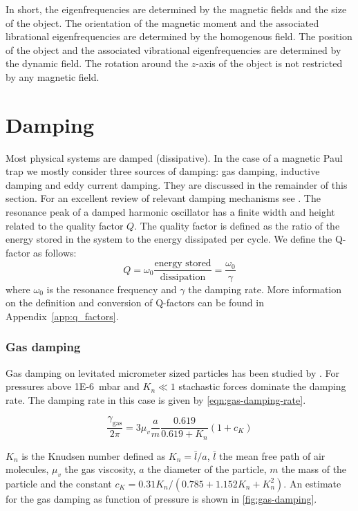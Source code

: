 In short, the eigenfrequencies are determined by the magnetic fields and the size of the object. The orientation of the magnetic moment and the associated librational eigenfrequencies are determined by the homogenous field. The position of the object and the associated vibrational eigenfrequencies are determined by the dynamic field. The rotation around the $z$-axis of the object is not restricted by any magnetic field.

\section{Damping}
\label{sec:damping}
Most physical systems are damped (dissipative). In the case of a magnetic Paul trap we mostly consider three sources of damping: gas damping, inductive damping and eddy current damping. They are discussed in the remainder of this section. For an excellent review of relevant damping mechanisms see \textcite{millen}. The resonance peak of a damped harmonic oscillator has a finite width and height related to the quality factor $Q$. The quality factor is defined as the ratio of the energy stored in the system to the energy dissipated per cycle. We define the Q-factor as follows:
\begin{equation*}
    Q = \omega_0 \frac{\text{energy stored}}{\text{dissipation}} = \frac{\omega_0}{\gamma}
\end{equation*}
where $\omega_0$ is the resonance frequency and $\gamma$ the damping rate. More information on the definition and conversion of Q-factors can be found in Appendix~\ref{app:q_factors}.

\subsubsection{Gas damping}
\label{subsubsec:gas-damping}
Gas damping on levitated micrometer sized particles has been studied by \textcite{millen}. For pressures above \qty{1E-6}{\milli\bar} and $K_n \ll 1$ stachastic forces dominate the damping rate. The damping rate in this case is given by \autoref{eqn:gas-damping-rate}.

\begin{equation}
    \frac{\gamma_{\text {gas}}}{2 \pi}=3 \mu_v \frac{a}{m} \frac{0.619}{0.619+K_n} \left( 1+c_K \right)
    \label{eqn:gas-damping-rate}
\end{equation}

$K_n$ is the Knudsen number defined as $K_n = \bar{l}/a$, $\bar{l}$ the mean free path of air molecules, $\mu_v$ the gas viscosity, $a$ the diameter of the particle, $m$ the mass of the particle and the constant $c_K = 0.31 K_n / \left(0.785 + 1.152 K_n + K_n^2 \right)$. An estimate for the gas damping as function of pressure is shown in \autoref{fig:gas-damping}.

